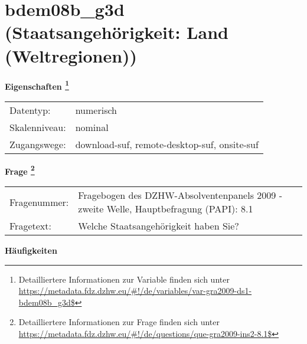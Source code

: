 
    \setcounter{footnote}{0}

    \vspace*{-1.8cm}
	\section{bdem08b\_g3d (Staatsangehörigkeit: Land (Weltregionen))}
	\label{section:bdem08b_g3d}



    \vspace*{0.5cm}
    \noindent\textbf{Eigenschaften
	\footnote{Detailliertere Informationen zur Variable finden sich unter
		\url{https://metadata.fdz.dzhw.eu/\#!/de/variables/var-gra2009-ds1-bdem08b_g3d$}}}\\
	\begin{tabularx}{\hsize}{@{}lX}
	Datentyp: & numerisch \\
	Skalenniveau: & nominal \\
	Zugangswege: &
	  download-suf, 
	  remote-desktop-suf, 
	  onsite-suf
 \\
    \end{tabularx}



				\vspace*{0.5cm}
                \noindent\textbf{Frage
	                \footnote{Detailliertere Informationen zur Frage finden sich unter
		              \url{https://metadata.fdz.dzhw.eu/\#!/de/questions/que-gra2009-ins2-8.1$}}}\\
				\begin{tabularx}{\hsize}{@{}lX}
					Fragenummer: &
					  Fragebogen des DZHW-Absolventenpanels 2009 - zweite Welle, Hauptbefragung (PAPI):
					  8.1
 \\
					Fragetext: & Welche Staatsangehörigkeit haben Sie? \\
				\end{tabularx}





        		\vspace*{0.5cm}
                \noindent\textbf{Häufigkeiten}

